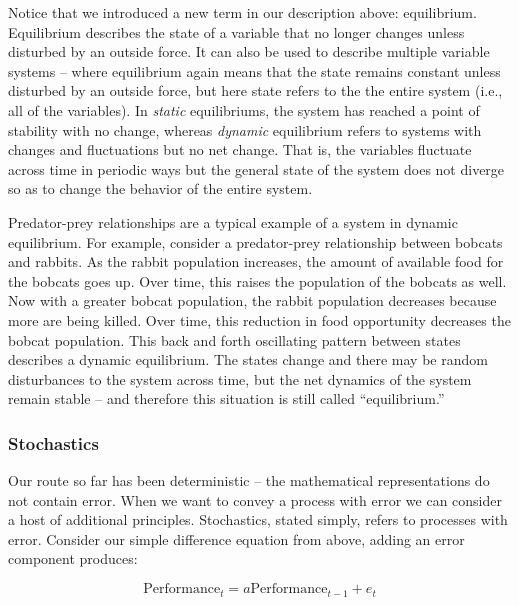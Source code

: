 \documentclass[english,,man]{apa6}
\theoremstyle{definition}
\theoremstyle{definition}
\theoremstyle{definition}
\theoremstyle{remark}
\begin{document}
Notice that we introduced a new term in our description above:
equilibrium. Equilibrium describes the state of a variable that no
longer changes unless disturbed by an outside force. It can also be used
to describe multiple variable systems -- where equilibrium again means
that the state remains constant unless disturbed by an outside force,
but here state refers to the the entire system (i.e., all of the
variables). In \emph{static} equilibriums, the system has reached a
point of stability with no change, whereas \emph{dynamic} equilibrium
refers to systems with changes and fluctuations but no net change. That
is, the variables fluctuate across time in periodic ways but the general
state of the system does not diverge so as to change the behavior of the
entire system.

Predator-prey relationships are a typical example of a system in dynamic
equilibrium. For example, consider a predator-prey relationship between
bobcats and rabbits. As the rabbit population increases, the amount of
available food for the bobcats goes up. Over time, this raises the
population of the bobcats as well. Now with a greater bobcat population,
the rabbit population decreases because more are being killed. Over
time, this reduction in food opportunity decreases the bobcat
population. This back and forth oscillating pattern between states
describes a dynamic equilibrium. The states change and there may be
random disturbances to the system across time, but the net dynamics of
the system remain stable -- and therefore this situation is still called
\enquote{equilibrium.}

\hypertarget{stochastics}{%
\subsubsection{Stochastics}\label{stochastics}}

Our route so far has been deterministic -- the mathematical
representations do not contain error. When we want to convey a process
with error we can consider a host of additional principles. Stochastics,
stated simply, refers to processes with error. Consider our simple
difference equation from above, adding an error component produces:

\begin{equation}
\label{diffE}
\textrm{Performance}_{t} = a \textrm{Performance}_{t-1} + e_{t}
\end{equation}
\end{document}
